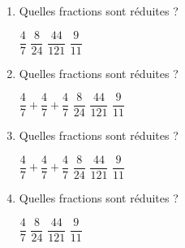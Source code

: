 \documentclass[a4,12pt]{article}
\begin{document}
\begin{enumerate}
	\item Quelles fractions sont réduites ?
	\begin{choices}
		\choice $\dfrac{4}{7}$
		\choice $\dfrac{8}{24}$
		\choice $\dfrac{44}{121}$
		\choice $\dfrac{9}{11}$
	\end{choices}

	\item Quelles fractions sont réduites ?
	\begin{choices}[4]
		\choice $\dfrac{4}{7}+\dfrac{4}{7}+\dfrac{4}{7}$
		\choice $\dfrac{8}{24}$
		\choice $\dfrac{44}{121}$
		\choice $\dfrac{9}{11}$
	\end{choices}

	\item Quelles fractions sont réduites ?
	\begin{inlineChoices}
		\choice $\dfrac{4}{7}+\dfrac{4}{7}+\dfrac{4}{7}$
		\choice $\dfrac{8}{24}$
		\choice $\dfrac{44}{121}$
		\choice $\dfrac{9}{11}$
	\end{inlineChoices}

	\item Quelles fractions sont réduites ?

	\begin{inlineChoices}
		\choice $\dfrac{4}{7}$
		\choice $\dfrac{8}{24}$
		\choice $\dfrac{44}{121}$
		\choice $\dfrac{9}{11}$
	\end{inlineChoices}
\end{enumerate}
\end{document}
